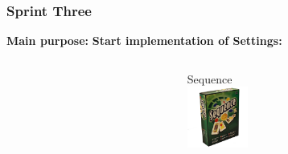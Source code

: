 \begin{frame}
\frametitle{Sprint Three}
\textbf{Main purpose:}
\textbf{Start implementation of Settings:}\\
\begin{columns}
\begin{column}{0.5\textwidth}

          \begin{center}
        \end{center}
        \begin{center}
        \end{center}
\end{column}
\begin{column}{0.5\textwidth}
        \begin{center}
         \end{center}
        \begin{center}
                     {Sequence\\
                     \includegraphics[height=2cm]{images/sequence}}
        \end{center}
\end{column}
\end{columns}
\end{frame}

